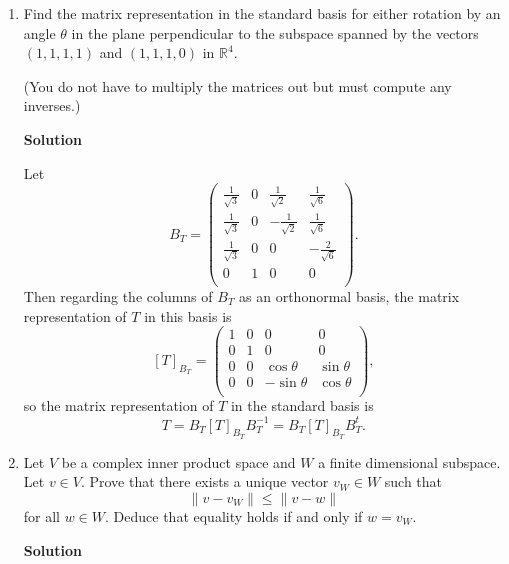 \documentclass{article}
\begin{document}
\begin{enumerate}
\item Find the matrix representation in the standard basis for either rotation by an angle \(\theta\) in the plane perpendicular to the subspace spanned by the vectors \((1,1,1,1)\) and \((1,1,1,0)\) in \(\mathbb{R}^4\).

(You do not have to multiply the matrices out but must compute any inverses.)

{\bf Solution}

Let
\[B_T = \left( \begin{array}{*{4}{c}}
               \frac{1}{\sqrt{3}} & 0 &  \frac{1}{\sqrt{2}} &  \frac{1}{\sqrt{6}} \\
               \frac{1}{\sqrt{3}} & 0 & -\frac{1}{\sqrt{2}} &  \frac{1}{\sqrt{6}} \\
               \frac{1}{\sqrt{3}} & 0 &                   0 & -\frac{2}{\sqrt{6}} \\
                                0 & 1 &                   0 &                   0 \\
               \end{array} \right).\]
Then regarding the columns of \(B_T\) as an orthonormal basis, the matrix representation of \(T\) in this basis is
\[[T]_{B_T} = \left( \begin{array}{*{4}{c}}
                     1 & 0 &            0 &           0 \\
                     0 & 1 &            0 &           0 \\
                     0 & 0 &  \cos \theta & \sin \theta \\
                     0 & 0 & -\sin \theta & \cos \theta \\
                     \end{array} \right),\]
so the matrix representation of \(T\) in the standard basis is
\[T = B_T [T]_{B_T} B_T^{-1}
    = B_T [T]_{B_T} B_T^t.\]



\item Let \(V\) be a complex inner product space and \(W\) a finite dimensional subspace.  Let \(v \in V\).  Prove that there exists a unique vector \(v_W \in W\) such that
\[\|v - v_W\| \leq \|v - w\|\]
for all \(w \in W\).  Deduce that equality holds if and only if \(w = v_W\).

{\bf Solution}


\end{enumerate}
\end{document}
